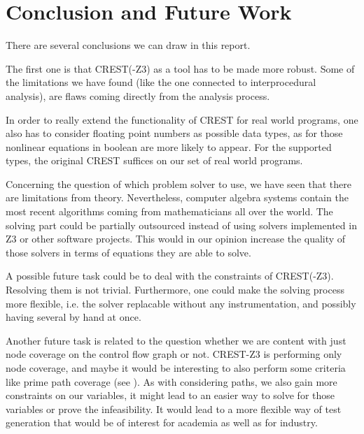 \documentclass[oribibl, twocolumn]{llncs}
\begin{document}
\section{Conclusion and Future Work}
\label{sctn:Conclusion}

There are several conclusions we can draw in this report.

The first one is that \textsc{CREST(-Z3)} as a tool has to be made more robust. Some of the limitations we have found (like the one connected to interprocedural analysis), are flaws coming directly from the analysis process.

In order to really extend the functionality of \textsc{CREST} for real world programs, one also has to consider floating point numbers as possible data types, as for those nonlinear equations in boolean are more likely to appear. For the supported types, the original \textsc{CREST} suffices on our set of real world programs.

Concerning the question of which problem solver to use, we have seen that there are limitations from theory. Nevertheless, computer algebra systems contain the most recent algorithms coming from mathematicians all over the world. The solving part could be partially outsourced instead of using solvers implemented in \textsc{Z3} or other software projects. This would in our opinion increase the quality of those solvers in terms of equations they are able to solve.

A possible future task could be to deal with the constraints of \textsc{CREST(-Z3)}. Resolving them is not trivial. Furthermore, one could make the solving process more flexible, i.e. the solver replacable without any instrumentation, and possibly having several by hand at once.

Another future task is related to the question whether we are content with just node coverage on the control flow graph or not. \textsc{CREST-Z3} is performing only node coverage, and maybe it would be interesting to also perform some criteria like prime path coverage (see \cite{ammann2008introduction}). As with considering paths, we also gain more constraints on our variables, it might lead to an easier way to solve for those variables or prove the infeasibility. It would lead to a more flexible way of test generation that would be of interest for academia as well as for industry.





\end{document}
